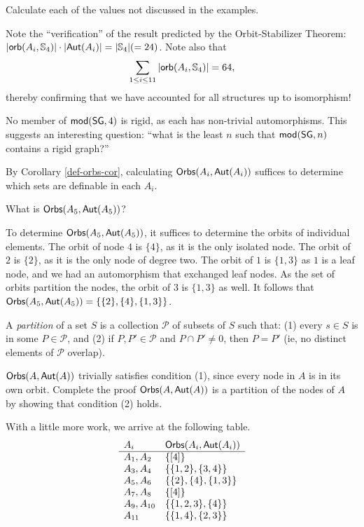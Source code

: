 \begin{aside}
    Calculate each of the values not discussed in the examples. 
\end{aside}

Note the ``verification'' of the result predicted by the Orbit-Stabilizer Theorem: $\mbox{$|\mbox{$\mathsf{orb}(A_i,\mbox{$\mathbb{S}_{4}$})$}|$} \cdot \mbox{$|\mbox{$\mathsf{Aut}(A_i)$}|$} = \mbox{$|\mbox{$\mathbb{S}_{4}$}|$} (= 24)$. Note also that 
\[
\sum_{1\leq i\leq 11}\mbox{$|\mbox{$\mathsf{orb}(A_i,\mbox{$\mathbb{S}_{4}$})$}|$}=64,
\]
thereby confirming that we have accounted for all structures up to isomorphism!
\begin{aside}
    No member of $\mbox{$\mathsf{mod}(\mbox{$\mathsf{SG}$},4)$}$ is rigid, as each has non-trivial automorphisms. This suggests an interesting question: ``what is the least $n$ such that $\mbox{$\mathsf{mod}(\mbox{$\mathsf{SG}$},n)$}$ contains a rigid graph?''
\end{aside}

By Corollary \ref{def-orbs-cor}, calculating $\mbox{$\mathsf{Orbs}(A_i,\mbox{$\mathsf{Aut}(A_i)$})$}$ suffices to determine which sets are definable in each $A_i$. 

\begin{example}
What is $\mbox{$\mathsf{Orbs}(A_5,\mbox{$\mathsf{Aut}(A_5)$})$}$?
\end{example}
To determine $\mbox{$\mathsf{Orbs}(A_5,\mbox{$\mathsf{Aut}(A_5)$})$}$, it suffices to determine the orbits of individual elements. The orbit of node $4$ is $\{4\}$, as it is the only isolated node. The orbit of $2$ is $\{2\}$, as it is the only node of degree two. The orbit of $1$ is $\{1, 3\}$ as $1$ is a leaf node, and we had an automorphism that exchanged leaf nodes. As the set of orbits partition the nodes, the orbit of $3$ is $\{1, 3\}$ as well. It follows that $\mbox{$\mathsf{Orbs}(A_5,\mbox{$\mathsf{Aut}(A_5)$})$} = \{\{2\}, \{4\}, \{1, 3\}\}$. 

\begin{aside}
A \emph{partition} of a set $S$ is a collection $\mathcal{P}$ of subsets of $S$ such that: (1) every $s \in S$ is in some $P \in \mathcal{P}$, and (2) if $P, P' \in \mathcal{P}$ and $P \cap P' \neq 0$, then $P = P'$ (ie, no distinct elements of $\mathcal{P}$ overlap).

$\mbox{$\mathsf{Orbs}(A,\mbox{$\mathsf{Aut}(A)$})$}$ trivially satisfies condition (1), since every node in $A$ is in its own orbit. Complete the proof $\mbox{$\mathsf{Orbs}(A,\mbox{$\mathsf{Aut}(A)$})$}$ is a partition of the nodes of $A$ by showing that condition (2) holds. 
\end{aside}  

With a little more work, we arrive at the following table. 
\[
\begin{array}{l l}
A_i & \mbox{$\mathsf{Orbs}(A_i,\mbox{$\mathsf{Aut}(A_i)$})$}\\
\hline
A_1, A_2 & \{[4]\}\\
A_3, A_4 & \{\{1,2\},\{3,4\}\}\\
A_5, A_6 & \{\{2\},\{4\},\{1,3\}\}\\
A_7, A_8 & \{[4]\}\\
A_9, A_{10} & \{\{1,2,3\},\{4\}\}\\
A_{11} & \{\{1,4\},\{2,3\}\}
\end{array}
\]

